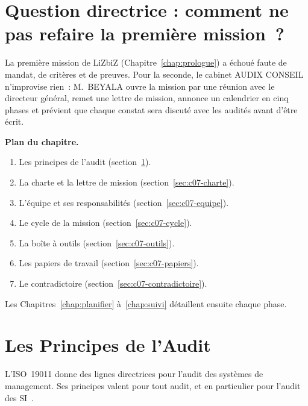 \bigskip

\section*{Question directrice : comment ne pas refaire la première mission~?}

La première mission de LiZbiZ (Chapitre~\ref{chap:prologue}) a échoué
faute de mandat, de critères et de preuves. Pour la seconde, le cabinet
AUDIX CONSEIL n'improvise rien~: M.~BEYALA ouvre la mission par une réunion
avec le directeur général, remet une lettre de mission, annonce un
calendrier en cinq phases et prévient que chaque constat sera discuté avec
les audités avant d'être écrit.

\medskip
\textbf{Plan du chapitre.}
\begin{enumerate}
    \item Les principes de l'audit (section~\ref{sec:c07-principes}).
    \item La charte et la lettre de mission (section~\ref{sec:c07-charte}).
    \item L'équipe et ses responsabilités (section~\ref{sec:c07-equipe}).
    \item Le cycle de la mission (section~\ref{sec:c07-cycle}).
    \item La boîte à outils (section~\ref{sec:c07-outils}).
    \item Les papiers de travail (section~\ref{sec:c07-papiers}).
    \item Le contradictoire (section~\ref{sec:c07-contradictoire}).
\end{enumerate}
Les Chapitres~\ref{chap:planifier} à~\ref{chap:suivi} détaillent ensuite
chaque phase.

\separateur

\section{Les Principes de l'Audit}
\label{sec:c07-principes}

L'ISO~19011 donne des lignes directrices pour l'audit des systèmes de
management. Ses principes valent pour tout audit, et en particulier pour
l'audit des SI~\cite{iso19011_2018}.

